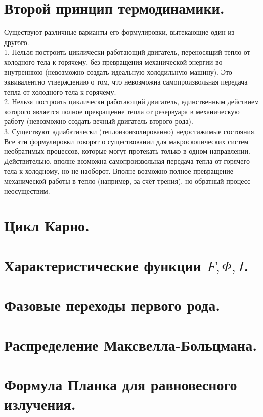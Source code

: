 \begin{multicols*}{2}
		\section{Второй принцип термодинамики.}
		Существуют различные варианты его формулировки, вытекающие один из другого.\\
		1. Нельзя построить циклически работающий двигатель, переносящий тепло от холодного тела к горячему, без превращения механической энергии во внутреннюю (невозможно создать идеальную холодильную машину). Это эквивалентно утверждению о том, что невозможна самопроизвольная передача тепла от холодного тела к горячему.\\
		2. Нельзя построить циклически работающий двигатель, единственным действием которого является полное превращение тепла от резервуара в механическую работу (невозможно создать вечный двигатель второго рода).\\
		3. Существуют адиабатически (теплоизоизолированно) недостижимые состояния.\\
		Все эти формулировки говорят о существовании для макроскопических систем необратимых процессов, которые могут протекать только в одном направлении. Действительно, вполне возможна самопроизвольная передача тепла от горячего тела к холодному, но не наоборот. Вполне возможно полное превращение механической работы в тепло (например, за счёт трения), но обратный процесс неосуществим.

		\section{Цикл Карно.}

		\section{Характеристические функции $F, \Phi, I$.}

		\section{Фазовые переходы первого рода.}

		\section{Распределение Максвелла-Больцмана.}

		\section{Формула Планка для равновесного излучения.}


\end{multicols*}
